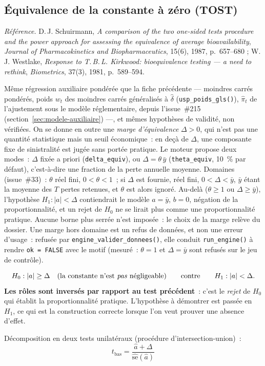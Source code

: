 \documentclass[a4paper,11pt]{article}
\newcommand{\code}[1]{\texttt{\small #1}}
\newcommand{\refl}[1]{{\small\textcolor{maincolor!70!black}{\textit{Référence.} #1}}\par\smallskip}
\newcounter{ficheid}
\newenvironment{fiche}[1]{%
  \stepcounter{ficheid}%
  \phantomsection
  \subsection{#1}%
  \label{fiche:\theficheid}%
}{%
  \end{description}\vspace{0.5em}%
}
\newcommand{\Cadre}{%
  \begin{description}[leftmargin=0pt, style=unboxed, itemsep=3pt, topsep=3pt, parsep=2pt]%
  \item[\textcolor{financeblue}{\textbf{1. Cadre, notations et hypothèses de validité (non testées).}}]}
\newcommand{\Hzero}{\item[\textcolor{financeblue}{\textbf{2. Hypothèse nulle.}}]}
\newcommand{\Stat}{\item[\textcolor{financeblue}{\textbf{3. Statistique de test.}}]}
\begin{document}
\begin{fiche}{Équivalence de la constante à zéro (TOST)}
\label{fiche:tost-constante}%
\refl{D.\,J. Schuirmann, \emph{A comparison of the two one-sided tests procedure and the power
approach for assessing the equivalence of average bioavailability}, \emph{Journal of
Pharmacokinetics and Biopharmaceutics}, 15(6), 1987, p.~657--680 ; W.\,J. Westlake,
\emph{Response to T.\,B.\,L. Kirkwood: bioequivalence testing --- a need to rethink},
\emph{Biometrics}, 37(3), 1981, p.~589--594.}
\Cadre
Même régression auxiliaire pondérée que la fiche précédente --- moindres carrés pondérés, poids
$w_t$ des moindres carrés généralisés à $\hat\delta$ (\code{usp\_poids\_gls()}), $\hat\pi_t$ de
l'ajustement sous le modèle réglementaire, depuis l'issue~\#215 (section~\ref{sec:modele-auxiliaire})
---, et mêmes hypothèses de validité, non vérifiées. On se donne
en outre une \emph{marge d'équivalence} $\Delta > 0$, qui n'est pas une quantité statistique mais
un seuil économique~: en deçà de $\Delta$, une composante fixe de sinistralité est jugée sans
portée pratique. Le moteur propose deux modes~: $\Delta$ fixée a priori
(\code{delta\_equiv}), ou $\Delta = \theta\,\bar y$ (\code{theta\_equiv}, 10~\% par défaut),
c'est-à-dire une fraction de la perte annuelle moyenne. Domaines (issue~\#33)~: $\theta$ réel
fini, $0 < \theta < 1$~; si $\Delta$ est fournie, réel fini, $0 < \Delta < \bar y$, $\bar y$ étant
la moyenne des $T$ pertes retenues, et $\theta$ est alors ignoré. Au-delà ($\theta \ge 1$ ou
$\Delta \ge \bar y$), l'hypothèse $H_1 : |a| < \Delta$ contiendrait le modèle $a = \bar y$,
$b = 0$, négation de la proportionnalité, et un rejet de $H_0$ ne se lirait plus comme une
proportionnalité pratique. Aucune borne plus serrée n'est imposée~: le choix de la marge relève
du dossier. Une marge hors domaine est un refus de données, et non une erreur d'usage~: refusée par
\code{engine\_valider\_donnees()}, elle conduit \code{run\_engine()} à rendre \code{ok = FALSE} avec
le motif (mesuré~: $\theta = 1$ et $\Delta = \bar y$ sont refusés sur le jeu de contrôle).
\Hzero
\[
  H_0 : |a| \ge \Delta \quad\text{(la constante n'est \emph{pas} négligeable)}
  \qquad\text{contre}\qquad
  H_1 : |a| < \Delta .
\]
\textbf{Les rôles sont inversés par rapport au test précédent}~: c'est le \emph{rejet} de $H_0$
qui établit la proportionnalité pratique. L'hypothèse à démontrer est passée en $H_1$, ce qui est
la construction correcte lorsque l'on veut prouver une absence d'effet.
\Stat
Décomposition en deux tests unilatéraux (procédure d'intersection-union)~:
\[
  t_{\text{bas}} = \frac{\hat a + \Delta}{\widehat{\mathrm{se}}(\hat a)}
\]
\end{fiche}
\end{document}
